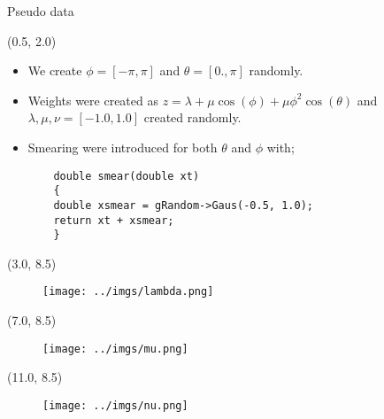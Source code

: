 \documentclass[10pt, xcolor={dvipsnames}, aspectratio = 169, sans,mathserif]{beamer}
\begin{document}
\begin{frame}[fragile]{Pseudo data}

\begin{textblock}{15.0}(0.5, 2.0)
\begin{itemize}
    \item We create $\phi = [-\pi, \pi]$ and $\theta = [0., \pi]$ randomly.

    \item Weights were created as $z = \lambda + \mu \cos(\phi) + \mu \phi^{2} \cos(\theta)$ and $\lambda, \mu, \nu = [-1.0, 1.0]$ created randomly.

    \item Smearing were introduced for both $\theta$ and $\phi$ with;

    \begin{verbatim}
    double smear(double xt)
    {
    double xsmear = gRandom->Gaus(-0.5, 1.0);
    return xt + xsmear;
    }
    \end{verbatim}

\end{itemize}
\end{textblock}

\begin{textblock}{4.0}(3.0, 8.5)
\begin{figure}
    \centering
    \texttt{[image: ../imgs/lambda.png]}
\end{figure}
\end{textblock}

\begin{textblock}{4.0}(7.0, 8.5)
\begin{figure}
    \centering
    \texttt{[image: ../imgs/mu.png]}
\end{figure}
\end{textblock}

\begin{textblock}{4.0}(11.0, 8.5)
\begin{figure}
    \centering
    \texttt{[image: ../imgs/nu.png]}
\end{figure}
\end{textblock}

\end{frame}
\end{document}
